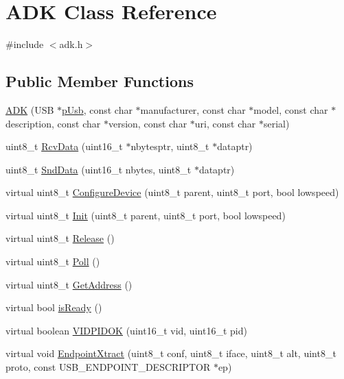 \hypertarget{class_a_d_k}{\section{\-A\-D\-K \-Class \-Reference}
\label{class_a_d_k}
}


{\ttfamily \#include $<$adk.\-h$>$}

\subsection*{\-Public \-Member \-Functions}
\begin{DoxyCompactItemize}
\item 
\hyperlink{class_a_d_k_a29492dcd9b7f6023b7866cd05188d61c}{\-A\-D\-K} (\-U\-S\-B $\ast$\hyperlink{class_a_d_k_ab28e3a19569c27f3ed5362e9800065c1}{p\-Usb}, const char $\ast$manufacturer, const char $\ast$model, const char $\ast$description, const char $\ast$version, const char $\ast$uri, const char $\ast$serial)
\item 
uint8\-\_\-t \hyperlink{class_a_d_k_a66b9943dfa89f783a8cdeb655e6fe9b1}{\-Rcv\-Data} (uint16\-\_\-t $\ast$nbytesptr, uint8\-\_\-t $\ast$dataptr)
\item 
uint8\-\_\-t \hyperlink{class_a_d_k_ac37bde02b6ed1436712d3619afb07c84}{\-Snd\-Data} (uint16\-\_\-t nbytes, uint8\-\_\-t $\ast$dataptr)
\item 
virtual uint8\-\_\-t \hyperlink{class_a_d_k_a14f24ca8246c5b6126a5aa72cf6ee120}{\-Configure\-Device} (uint8\-\_\-t parent, uint8\-\_\-t port, bool lowspeed)
\item 
virtual uint8\-\_\-t \hyperlink{class_a_d_k_a8c5c2e212c748966ccd863499d202063}{\-Init} (uint8\-\_\-t parent, uint8\-\_\-t port, bool lowspeed)
\item 
virtual uint8\-\_\-t \hyperlink{class_a_d_k_a7f64af34d7890f87ceab5d144f6c26ef}{\-Release} ()
\item 
virtual uint8\-\_\-t \hyperlink{class_a_d_k_af3784434ee6a1c6f3dc5b591f467e703}{\-Poll} ()
\item 
virtual uint8\-\_\-t \hyperlink{class_a_d_k_a1a972e8dc98b60ab27528db3af2618c3}{\-Get\-Address} ()
\item 
virtual bool \hyperlink{class_a_d_k_a1dee02856625dfcac4b0cdd4e8672cef}{is\-Ready} ()
\item 
virtual boolean \hyperlink{class_a_d_k_a1fc7e5918fa0b5fbffdd1e488dd08427}{\-V\-I\-D\-P\-I\-D\-O\-K} (uint16\-\_\-t vid, uint16\-\_\-t pid)
\item 
virtual void \hyperlink{class_a_d_k_aac2fac5410faea0e439b4f7e688b3d75}{\-Endpoint\-Xtract} (uint8\-\_\-t conf, uint8\-\_\-t iface, uint8\-\_\-t alt, uint8\-\_\-t proto, const \-U\-S\-B\-\_\-\-E\-N\-D\-P\-O\-I\-N\-T\-\_\-\-D\-E\-S\-C\-R\-I\-P\-T\-O\-R $\ast$ep)
\end{DoxyCompactItemize}

